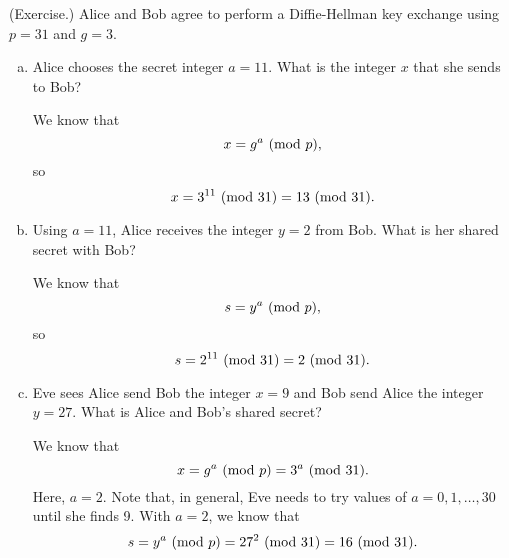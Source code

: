 \documentclass[letterpaper]{article}
\begin{document}
\begin{mdframed}
    (Exercise.) Alice and Bob agree to perform a Diffie-Hellman key exchange using $p = 31$ and $g = 3$. 
    
    \begin{enumerate}[(a)]
        \item Alice chooses the secret integer $a = 11$. What is the integer $x$ that she sends to Bob?
        \begin{mdframed}
            We know that 
            \[x = g^a \ (\mathrm{mod}\ p),\]
            so 
            \[x = 3^{11} \ (\mathrm{mod}\ 31) = 13 \ (\mathrm{mod}\ 31).\] 
        \end{mdframed}

        \item Using $a = 11$, Alice receives the integer $y = 2$ from Bob. What is her shared secret with Bob? 
        \begin{mdframed}
            We know that 
            \[s = y^a \ (\mathrm{mod}\ p),\]
            so 
            \[s = 2^{11} \ (\mathrm{mod}\ 31) = 2 \ (\mathrm{mod}\ 31).\]
        \end{mdframed}

        \item Eve sees Alice send Bob the integer $x = 9$ and Bob send Alice the integer $y = 27$. What is Alice and Bob's shared secret? 
        \begin{mdframed}
            We know that 
            \[x = g^a \ (\mathrm{mod}\ p) = 3^a \ (\mathrm{mod}\ 31).\]
            Here, $a = 2$. Note that, in general, Eve needs to try values of $a = 0, 1, \hdots, 30$ until she finds 9. With $a = 2$, we know that 
            \[s = y^a \ (\mathrm{mod}\ p) = 27^{2} \ (\mathrm{mod}\ 31) = 16 \ (\mathrm{mod}\ 31).\]
        \end{mdframed}
    \end{enumerate}
\end{mdframed}
\end{document}
